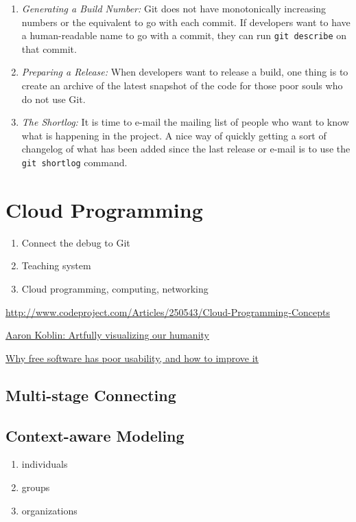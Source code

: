 \documentclass[draftclsnofoot,journal,onecolumn,12pt]{IEEEtran}
\begin{document}
\begin{enumerate}
  \item \textit{Generating a Build Number:} Git does not have monotonically increasing numbers or the equivalent to go with each commit. If developers want to have a human-readable name to go with a commit, they can run \texttt{git describe} on that commit.
  \item \textit{Preparing a Release:} When developers want to release a build, one thing is to create an archive of the latest snapshot of the code for those poor souls who do not use Git.
  \item \textit{The Shortlog:} It is time to e-mail the mailing list of people who want to know what is happening in the project. A nice way of quickly getting a sort of changelog of what has been added since the last release or e-mail is to use the \texttt{git shortlog} command.
\end{enumerate}

\section{Cloud Programming}

\begin{enumerate}
  \item Connect the debug to Git
  \item Teaching system
  \item Cloud programming, computing, networking
\end{enumerate}

\url{http://www.codeproject.com/Articles/250543/Cloud-Programming-Concepts}

\href{http://www.ted.com/talks/aaron_koblin.html}{Aaron Koblin: Artfully visualizing our humanity}

\href{http://www.mpt.net.nz/2012/06/why-free-software-has-poor-usability/}{Why free software has poor usability, and how to improve it}

\subsection{Multi-stage Connecting}

\subsection{Context-aware Modeling}


\begin{enumerate}
  \item individuals
  \item groups
  \item organizations
\end{enumerate}
\end{document}
